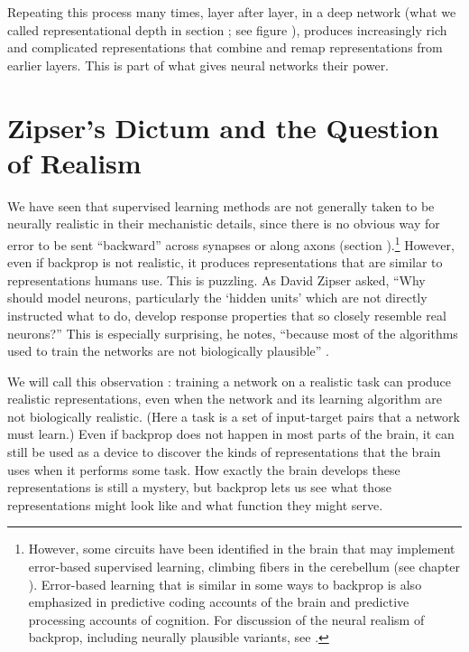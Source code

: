 Repeating this process many times, layer after layer, in a deep network (what we called representational depth in section ; see figure ), produces increasingly rich and complicated representations that combine and remap representations from earlier layers. This is part of what gives neural networks their power.

\section{Zipser's Dictum and the Question of Realism}\label{zipserDictum}

We have seen that supervised learning methods are not generally taken to be neurally realistic in their mechanistic details, since there is no obvious way for error to be sent ``backward'' across synapses or along axons (section ).\footnote{However, some circuits have been identified in the brain that may implement error-based supervised learning, \eg climbing fibers in the cerebellum (see chapter ). Error-based learning that is similar in some ways to backprop is also emphasized in predictive coding accounts of the brain and predictive processing accounts of cognition. For discussion of the neural realism of backprop, including neurally plausible variants, see \cite{whittington2019theories}.}  However, even if backprop is not realistic, it produces representations that are similar to representations humans use. This is puzzling. As David Zipser asked, ``Why should model neurons, particularly the `hidden units' which are not directly instructed what to do, develop response properties that so closely resemble real neurons?'' This is especially surprising, he notes, ``because most of the algorithms used to train the networks are not biologically plausible'' \cite{zipser1992identification}. %

We will call this observation : training a network on a realistic task can produce realistic representations, even when the network and its learning algorithm are not biologically realistic. (Here a task is a set of input-target pairs that a network must learn.) Even if backprop does not happen in most parts of the brain, it can still be used as a device to discover the kinds of representations that the brain uses when it performs some task. How exactly the brain develops these representations is still a mystery, but backprop lets us see what those representations might look like and what function they might serve.

